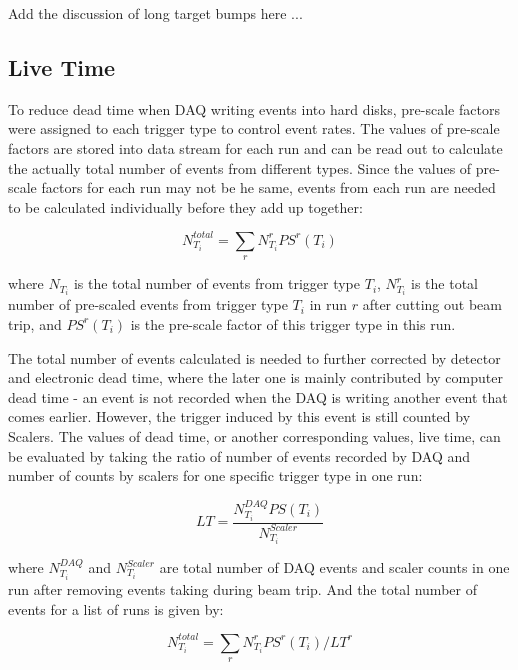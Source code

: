 \documentclass[a4paper,10.5pt]{article}
\begin{document}
Add the discussion of long target bumps here ...

\subsection{Live Time}

To reduce dead time when DAQ writing events into hard disks, pre-scale factors were assigned to each trigger type to control event rates. The values of pre-scale factors are stored into data stream for each run and can be read out to calculate the actually total number of events from different types. Since the values of pre-scale factors for each run may not be he same, events from each run are needed to be calculated individually before they add up together:

\begin{equation}
  N_{T_{i}}^{total} = \sum_{r} N_{T_{i}}^{r} PS^{r}(T_{i})
\end{equation}

where $N_{T_{i}}$ is the total number of events from trigger type $T_{i}$, $N_{T_{i}}^{r}$ is the total number of pre-scaled events from trigger type $T_{i}$ in run $r$ after cutting out beam trip, and $PS^{r}(T_{i})$ is the pre-scale factor of this trigger type in this run.

The total number of events calculated is needed to further corrected by detector and electronic dead time, where the later one is mainly contributed by computer dead time - an event is not recorded when the DAQ is writing another event that comes earlier. However, the trigger induced by this event is still counted by Scalers. The values of dead time, or another corresponding values, live time, can be evaluated by taking the ratio of number of events recorded by DAQ and number of counts by scalers for one specific trigger type in one run:

\begin{equation}
  LT = \frac{N_{T_{i}}^{DAQ} PS(T_{i})}{N_{T_{i}}^{Scaler}}
\end{equation}

where $N_{T_{i}}^{DAQ}$ and $N_{T_{i}}^{Scaler}$ are total number of DAQ events and scaler counts in one run after removing events taking during beam trip. And the total number of events for a list of runs is given by:

\begin{equation}
  N_{T_{i}}^{total} = \sum_{r} N_{T_{i}}^{r} PS^{r}(T_{i})/LT^{r}
\end{equation}
\end{document}
